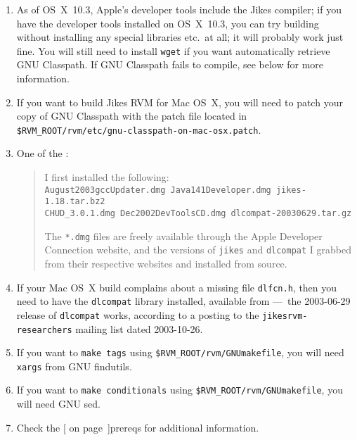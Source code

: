\begin{enumerate}

\item As of OS~X~10.3, Apple's developer tools include the Jikes
compiler; if you have the developer tools installed on OS~X~10.3, you
can try building without installing any special libraries etc.\ at
all; it will probably work just fine. You will still need to install
\texttt{wget} if you want automatically retrieve GNU Classpath. If GNU
Classpath fails to compile, see below for more information.

\item
If you want to build Jikes RVM for Mac OS~X, you will need to patch
your copy of GNU Classpath with the patch file located
in \texttt{\$RVM\_\-ROOT/\-rvm/\-etc/\-gnu-classpath-on-mac-osx.patch}.

\item
One of the :
\begin{quote}
\raggedright
I first installed the following: \\
\OneCMStrut{}\texttt{August2003gccUpdater.dmg  Java141Developer.dmg jikes-1.18.tar.bz2 \\
\OneCMStrut{}CHUD\_3.0.1.dmg Dec2002DevToolsCD.dmg     dlcompat-20030629.tar.gz \\
}

The \texttt{*.dmg} files are freely available through the Apple
Developer Connection 
website, and the versions of \texttt{jikes} and \texttt{dlcompat} I grabbed from their
respective websites and installed from source.
\end{quote}

\item
If your Mac OS~X build complains about a missing file  \texttt{dlfcn.h}, then 
you need to have the \texttt{dlcompat} library installed, available from 
---~the 2003-06-29 release of \texttt{dlcompat} works, according to a posting to
the \texttt{jikesrvm-researchers} mailing list dated 2003-10-26.

\item
If you want to \texttt{make tags} using
\texttt{\$RVM\_ROOT/rvm/GNUmakefile}, you will need \texttt{xargs}
from GNU findutils.

\item
If you want to \texttt{make conditionals} using
\texttt{\$RVM\_ROOT/rvm/GNUmakefile}, you will need GNU sed.

\item
Check the [ on page~\Pageref]{prereqs} for additional
information. 

\end{enumerate}


